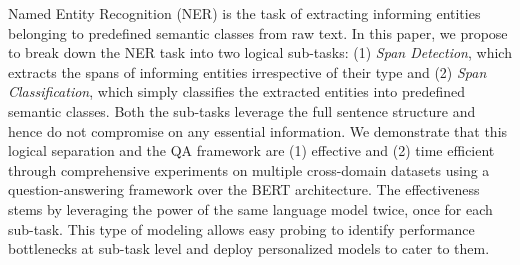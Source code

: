 Named Entity Recognition (NER) is the task of extracting informing entities belonging to predefined semantic classes from raw text. In this paper, we propose to break down the NER task into two logical sub-tasks: (1) \textit{Span Detection}, which extracts the spans of informing entities irrespective of their type and (2) \textit{Span Classification}, which simply classifies the extracted entities into predefined semantic classes. 
Both the sub-tasks leverage the full sentence structure and hence do not compromise on any essential information. 
We demonstrate that this logical separation and the QA framework are (1) effective and (2) time efficient through comprehensive experiments on multiple cross-domain datasets using a question-answering framework over the BERT architecture. 
The effectiveness stems by leveraging the power of the same language model twice, once for each sub-task. This type of modeling allows easy probing to identify performance bottlenecks at sub-task level and deploy personalized models to cater to them.

